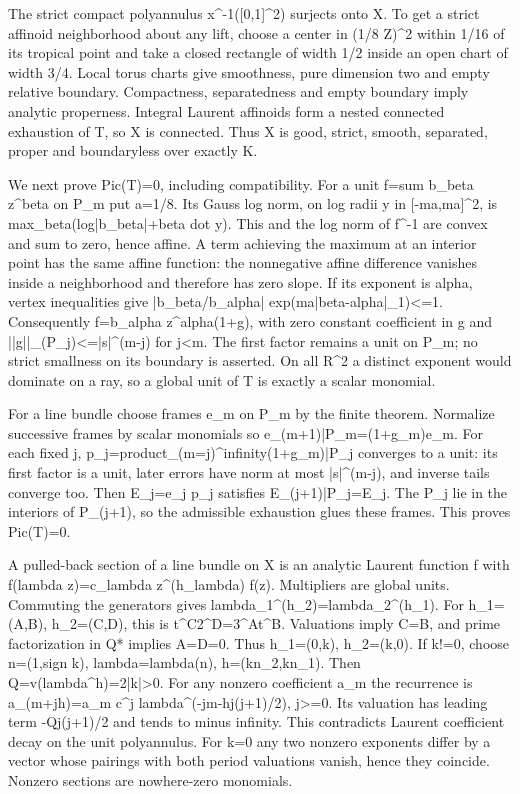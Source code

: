 \documentclass[11pt]{article}
\begin{document}
The strict compact polyannulus x\textasciicircum{}-1([0,1]\textasciicircum{}2) surjects onto X. To get a strict affinoid neighborhood about any lift, choose a center in (1/8 Z)\textasciicircum{}2 within 1/16 of its tropical point and take a closed rectangle of width 1/2 inside an open chart of width 3/4. Local torus charts give smoothness, pure dimension two and empty relative boundary. Compactness, separatedness and empty boundary imply analytic properness. Integral Laurent affinoids form a nested connected exhaustion of T, so X is connected. Thus X is good, strict, smooth, separated, proper and boundaryless over exactly K.

We next prove Pic(T)=0, including compatibility. For a unit f=sum b\_beta z\textasciicircum{}beta on P\_m put a=1/8. Its Gauss log norm, on log radii y in [-ma,ma]\textasciicircum{}2, is max\_beta(log|b\_beta|+beta dot y). This and the log norm of f\textasciicircum{}-1 are convex and sum to zero, hence affine. A term achieving the maximum at an interior point has the same affine function: the nonnegative affine difference vanishes inside a neighborhood and therefore has zero slope. If its exponent is alpha, vertex inequalities give |b\_beta/b\_alpha| exp(ma|beta-alpha|\_1)<=1. Consequently f=b\_alpha z\textasciicircum{}alpha(1+g), with zero constant coefficient in g and ||g||\_(P\_j)<=|s|\textasciicircum{}(m-j) for j<m. The first factor remains a unit on P\_m; no strict smallness on its boundary is asserted. On all R\textasciicircum{}2 a distinct exponent would dominate on a ray, so a global unit of T is exactly a scalar monomial.

For a line bundle choose frames e\_m on P\_m by the finite theorem. Normalize successive frames by scalar monomials so e\_(m+1)|P\_m=(1+g\_m)e\_m. For each fixed j, p\_j=product\_(m=j)\textasciicircum{}infinity(1+g\_m)|P\_j converges to a unit: its first factor is a unit, later errors have norm at most |s|\textasciicircum{}(m-j), and inverse tails converge too. Then E\_j=e\_j p\_j satisfies E\_(j+1)|P\_j=E\_j. The P\_j lie in the interiors of P\_(j+1), so the admissible exhaustion glues these frames. This proves Pic(T)=0.

A pulled-back section of a line bundle on X is an analytic Laurent function f with f(lambda z)=c\_lambda z\textasciicircum{}(h\_lambda) f(z). Multipliers are global units. Commuting the generators gives lambda\_1\textasciicircum{}(h\_2)=lambda\_2\textasciicircum{}(h\_1). For h\_1=(A,B), h\_2=(C,D), this is t\textasciicircum{}C2\textasciicircum{}D=3\textasciicircum{}At\textasciicircum{}B. Valuations imply C=B, and prime factorization in Q* implies A=D=0. Thus h\_1=(0,k), h\_2=(k,0). If k!=0, choose n=(1,sign k), lambda=lambda(n), h=(kn\_2,kn\_1). Then Q=v(lambda\textasciicircum{}h)=2|k|>0. For any nonzero coefficient a\_m the recurrence is a\_(m+jh)=a\_m c\textasciicircum{}j lambda\textasciicircum{}(-jm-hj(j+1)/2), j>=0. Its valuation has leading term -Qj(j+1)/2 and tends to minus infinity. This contradicts Laurent coefficient decay on the unit polyannulus. For k=0 any two nonzero exponents differ by a vector whose pairings with both period valuations vanish, hence they coincide. Nonzero sections are nowhere-zero monomials.
\end{document}
